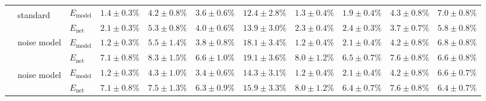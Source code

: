 \begin{sidewaystable}
\begin{tabular}{p{2.2cm} p{1.7cm} l r r r r r r r r }
	\\\cmidrule(l){2-11}
	&
	\multirow{2}{1.7cm}{\raggedleft %
	standard\textsuperscript{\dag}} &
	$E_\mathrm{model}$ & 
	\color{Gray}$1.4 \pm 0.3\%$ & \color{Gray}$4.2 \pm 0.8\%$ & \color{Gray}$3.6 \pm 0.6\%$ & \color{Gray}$12.4 \pm 2.8\%$ & \color{Gray}$1.3 \pm 0.4\%$ & \color{Gray}$1.9 \pm 0.4\%$ & \color{Gray}$4.3 \pm 0.8\%$ & \color{Gray}$7.0 \pm 0.8\%$
	\\
	& & 
	$E_\mathrm{net}$ &
	\cellcolor{White!100!SteelBlue}$\mathbf{2.1 \pm 0.3\%}$ & \cellcolor{White!100!SteelBlue}$\mathbf{5.3 \pm 0.8\%}$ & \cellcolor{White!100!SteelBlue}$\mathbf{4.0 \pm 0.6\%}$ & \cellcolor{White!88!SteelBlue}$13.9 \pm 3.0\%$ & \cellcolor{White!100!SteelBlue}$\mathbf{2.3 \pm 0.4\%}$ & \cellcolor{White!100!SteelBlue}$\mathbf{2.4 \pm 0.3\%}$ & \cellcolor{White!100!SteelBlue}$\mathbf{3.7 \pm 0.7\%}$ & \cellcolor{White!100!SteelBlue}$\mathbf{5.8 \pm 0.8\%}$
	\\\cmidrule(l){2-11}
	&
	\multirow{2}{1.7cm}{\raggedleft %
	noise model} &
	$E_\mathrm{model}$ & 
	\color{Gray}$1.2 \pm 0.3\%$ & \color{Gray}$5.5 \pm 1.4\%$ & \color{Gray}$3.8 \pm 0.8\%$ & \color{Gray}$18.1 \pm 3.4\%$ & \color{Gray}$1.2 \pm 0.4\%$ & \color{Gray}$2.1 \pm 0.4\%$ & \color{Gray}$4.2 \pm 0.8\%$ & \color{Gray}$6.8 \pm 0.8\%$
	\\
	& & 
	$E_\mathrm{net}$ &
	\cellcolor{White!38!SteelBlue}$7.1 \pm 0.8\%$ & \cellcolor{White!57!SteelBlue}$8.3 \pm 1.5\%$ & \cellcolor{White!57!SteelBlue}$6.6 \pm 1.0\%$ & \cellcolor{White!57!SteelBlue}$19.1 \pm 3.6\%$ & \cellcolor{White!38!SteelBlue}$8.0 \pm 1.2\%$ & \cellcolor{White!57!SteelBlue}$6.5 \pm 0.7\%$ & \cellcolor{White!57!SteelBlue}$7.6 \pm 0.8\%$ & \cellcolor{White!69!SteelBlue}$6.6 \pm 0.8\%$
	\\\cmidrule(l){2-11}
	&
	\multirow{2}{1.7cm}{\raggedleft %
	noise model\textsuperscript{\dag}} &
	$E_\mathrm{model}$ & 
	\color{Gray}$\mathbf{1.2 \pm 0.3\%}$ & \color{Gray}$4.3 \pm 1.0\%$ & \color{Gray}$3.4 \pm 0.6\%$ & \color{Gray}$14.3 \pm 3.1\%$ & \color{Gray}$1.2 \pm 0.4\%$ & \color{Gray}$2.1 \pm 0.4\%$ & \color{Gray}$\mathbf{4.2 \pm 0.8\%}$ & \color{Gray}$6.6 \pm 0.7\%$
	\\
	& & 
	$E_\mathrm{net}$ &
	\cellcolor{White!32!SteelBlue}$7.1 \pm 0.8\%$ & \cellcolor{White!82!SteelBlue}$7.5 \pm 1.3\%$ & \cellcolor{White!75!SteelBlue}$6.3 \pm 0.9\%$ & \cellcolor{White!82!SteelBlue}$15.9 \pm 3.3\%$ & \cellcolor{White!32!SteelBlue}$8.0 \pm 1.2\%$ & \cellcolor{White!63!SteelBlue}$6.4 \pm 0.7\%$ & \cellcolor{White!63!SteelBlue}$7.6 \pm 0.8\%$ & \cellcolor{White!75!SteelBlue}$6.4 \pm 0.7\%$

\end{tabular}
\end{sidewaystable}
